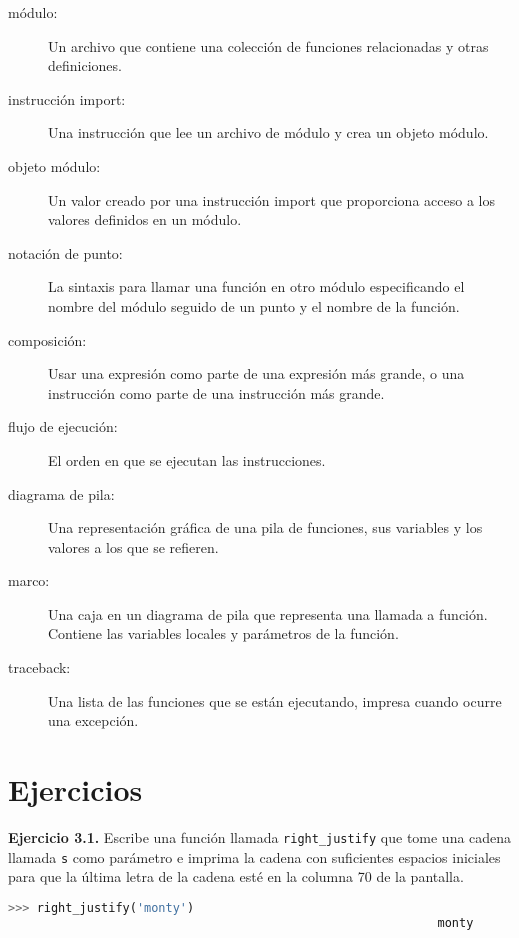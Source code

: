 \documentclass[12pt,letterpaper]{book}
\begin{document}
\begin{description}
\item[módulo:] Un archivo que contiene una colección de funciones relacionadas y otras definiciones.

\item[instrucción import:] Una instrucción que lee un archivo de módulo y crea un objeto módulo.

\item[objeto módulo:] Un valor creado por una instrucción import que proporciona acceso a los valores definidos en un módulo.

\item[notación de punto:] La sintaxis para llamar una función en otro módulo especificando el nombre del módulo seguido de un punto y el nombre de la función.

\item[composición:] Usar una expresión como parte de una expresión más grande, o una instrucción como parte de una instrucción más grande.

\item[flujo de ejecución:] El orden en que se ejecutan las instrucciones.

\item[diagrama de pila:] Una representación gráfica de una pila de funciones, sus variables y los valores a los que se refieren.

\item[marco:] Una caja en un diagrama de pila que representa una llamada a función. Contiene las variables locales y parámetros de la función.

\item[traceback:] Una lista de las funciones que se están ejecutando, impresa cuando ocurre una excepción.
\end{description}

\section{Ejercicios}

\textbf{Ejercicio 3.1.} Escribe una función llamada \texttt{right\_justify} que tome una cadena llamada \texttt{s} como parámetro e imprima la cadena con suficientes espacios iniciales para que la última letra de la cadena esté en la columna 70 de la pantalla.

\begin{lstlisting}[language=Python]
>>> right_justify('monty')
                                                            monty
\end{lstlisting}
\end{document}
